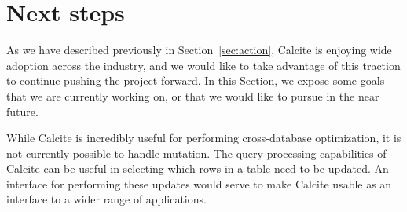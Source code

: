 \section{Next steps}
\label{sec:future}

As we have described previously in Section~\ref{sec:action}, Calcite is enjoying wide adoption across the industry, and we would like to take advantage of this traction to continue pushing the project forward. In this Section, we expose some goals that we are currently working on, or that we would like to pursue in the near future. 

 While Calcite is incredibly useful for performing cross-database optimization, it is not currently possible to handle mutation.
The query processing capabilities of Calcite can be useful in selecting which rows in a table need to be updated.
An interface for performing these updates would serve to make Calcite usable as an interface to a wider range of applications.






